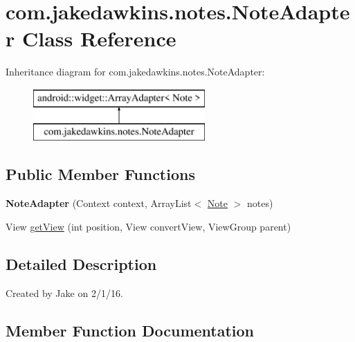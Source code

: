 \hypertarget{classcom_1_1jakedawkins_1_1notes_1_1_note_adapter}{}\section{com.\+jakedawkins.\+notes.\+Note\+Adapter Class Reference}
\label{classcom_1_1jakedawkins_1_1notes_1_1_note_adapter}
Inheritance diagram for com.\+jakedawkins.\+notes.\+Note\+Adapter\+:\begin{figure}[H]
\begin{center}
\leavevmode
\includegraphics[height=2.000000cm]{classcom_1_1jakedawkins_1_1notes_1_1_note_adapter}
\end{center}
\end{figure}
\subsection*{Public Member Functions}
\begin{DoxyCompactItemize}
\item 
{\bfseries Note\+Adapter} (Context context, Array\+List$<$ \hyperlink{classcom_1_1jakedawkins_1_1notes_1_1_note}{Note} $>$ notes)\hypertarget{classcom_1_1jakedawkins_1_1notes_1_1_note_adapter_a08bd80079044ffa1a2cedbc23af12e24}{}\label{classcom_1_1jakedawkins_1_1notes_1_1_note_adapter_a08bd80079044ffa1a2cedbc23af12e24}

\item 
View \hyperlink{classcom_1_1jakedawkins_1_1notes_1_1_note_adapter_a7a4ef147743422a5a87f93a1958b185f}{get\+View} (int position, View convert\+View, View\+Group parent)
\end{DoxyCompactItemize}


\subsection{Detailed Description}
Created by Jake on 2/1/16. 

\subsection{Member Function Documentation}

